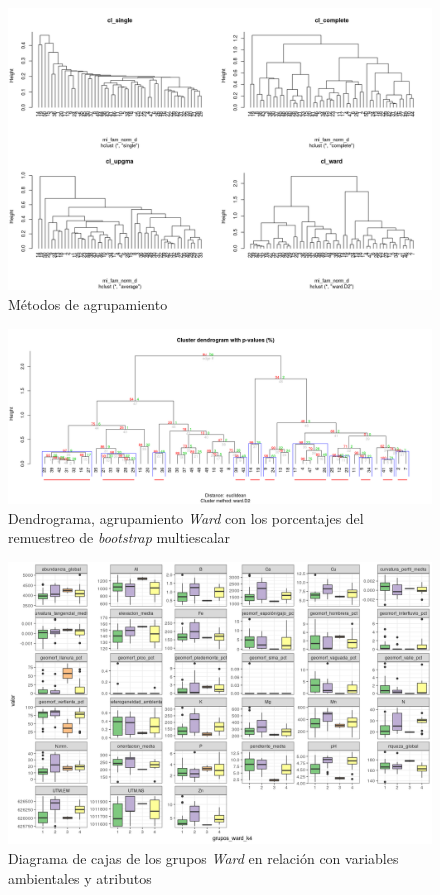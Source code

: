 \documentclass[11pt,]{article}
\begin{document}
\begin{figure}
\centering
\includegraphics{metodosdeagrupamiento.png}
\caption{Métodos de agrupamiento \label{fig:metodosdeagrupamiento}}
\end{figure}

\begin{figure}
\centering
\includegraphics{bootstrap_Ward.png}
\caption{Dendrograma, agrupamiento \emph{Ward} con los porcentajes del
remuestreo de \emph{bootstrap} multiescalar
\label{fig:*bootstrap*_multiescalar}}
\end{figure}

\begin{figure}
\centering
\includegraphics{correlograma_wardyvariablesambientales.png}
\caption{Diagrama de cajas de los grupos \emph{Ward} en relación con
variables ambientales y atributos \label{fig:ward_con_variables}}
\end{figure}
\end{document}

